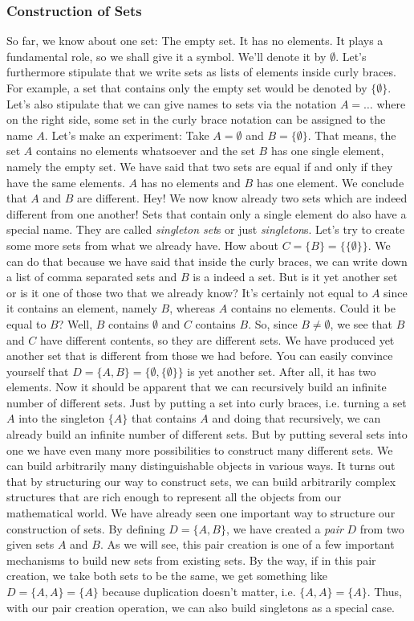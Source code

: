\subsubsection{Construction of Sets}
So far, we know about one set: The empty set. It has no elements. It plays a fundamental role, so we shall give it a symbol. We'll denote it by $\emptyset$. Let's furthermore stipulate that we write sets as lists of elements inside curly braces. For example, a set that contains only the empty set would be denoted by $\{ \emptyset \}$. Let's also stipulate that we can give names to sets via the notation $A = \ldots$ where on the right side, some set in the curly brace notation can be assigned to the name $A$. Let's make an experiment: Take $A = \emptyset$ and $B = \{ \emptyset \}$. That means, the set $A$ contains no elements whatsoever and the set $B$ has one single element, namely the empty set. We have said that two sets are equal if and only if they have the same elements. $A$ has no elements and $B$ has one element. We conclude that $A$ and $B$ are different. Hey! We now know already two sets which are indeed different from one another! Sets that contain only a single element do also have a special name. They are called \emph{singleton set}s or just \emph{singleton}s. Let's try to create some more sets from what we already have. How about $C = \{ B \} = \{ \{ \emptyset \} \}$. We can do that because we have said that inside the curly braces, we can write down a list of comma separated sets and $B$ is a indeed a set. But is it yet another set or is it one of those two that we already know? It's certainly not equal to $A$ since it contains an element, namely $B$, whereas $A$ contains no elements. Could it be equal to $B$? Well, $B$ contains $\emptyset$ and $C$ contains $B$. So, since $B \neq \emptyset$, we see that $B$ and $C$ have different contents, so they are different sets. We have produced yet another set that is different from those we had before. You can easily convince yourself that $D = \{ A, B\} = \{ \emptyset, \{\emptyset\} \}$ is yet another set. After all, it has two elements. Now it should be apparent that we can recursively build an infinite number of different sets. Just by putting a set into curly braces, i.e. turning a set $A$ into the singleton $\{A\}$ that contains $A$ and doing that recursively, we can already build an infinite number of different sets. But by putting several sets into one we have even many more possibilities to construct many different sets. We can build arbitrarily many distinguishable objects in various ways. It turns out that by structuring our way to construct sets, we can build arbitrarily complex structures that are rich enough to represent all the objects from our mathematical world. We have already seen one important way to structure our construction of sets. By defining $D = \{ A, B \}$, we have created a \emph{pair} $D$ from two given sets $A$ and $B$. As we will see, this pair creation is one of a few important mechanisms to build new sets from existing sets. By the way, if in this pair creation, we take both sets to be the same, we get something like $D = \{ A, A \} = \{ A \}$ because duplication doesn't matter, i.e. $ \{ A, A \} = \{ A \}$. Thus, with our pair creation operation, we can also build singletons as a special case.

